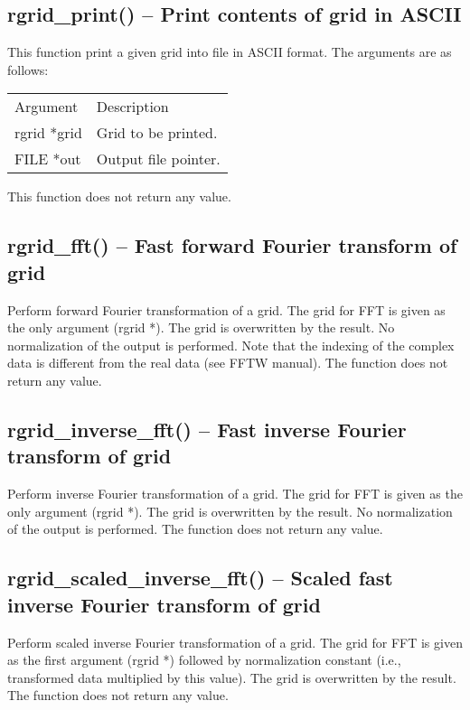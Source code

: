 \documentclass[12pt,letterpaper]{report}
\begin{document}
\subsection{rgrid\_print() -- Print contents of grid in ASCII}

This function print a given grid into file in ASCII format. The arguments are as follows:
\begin{longtable}{p{} p{}}
Argument & Description\\
\cline{1-2}
rgrid *grid & Grid to be printed.\\
FILE *out & Output file pointer.\\
\end{longtable}
\noindent
This function does not return any value.

\subsection{rgrid\_fft() -- Fast forward Fourier transform of grid}

Perform forward Fourier transformation of a grid. The grid for FFT is given as the only argument (rgrid *). The grid is overwritten by the result. No normalization of the output is performed. Note that the indexing of the complex data is different from the real data (see FFTW manual). The function does not return any value. 

\subsection{rgrid\_inverse\_fft() -- Fast inverse Fourier transform of grid}

Perform inverse Fourier transformation of a grid. The grid for FFT is given as the only argument (rgrid *). The grid is overwritten by the result. No normalization of the output is performed. The function does not return any value.

\subsection{rgrid\_scaled\_inverse\_fft() -- Scaled fast inverse Fourier transform of grid}

Perform scaled inverse Fourier transformation of a grid. The grid for FFT is given as the first argument (rgrid *) followed by normalization constant (i.e., transformed data multiplied by this value). The grid is overwritten by the result. The function does not return any value.
\end{document}
